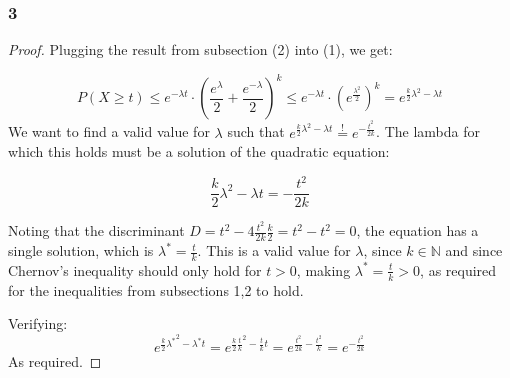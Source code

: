 \subsubsection{3}
\begin{proof}
    Plugging the result from subsection (2) into (1), we get:
    
    \begin{equation*}
        P(X\geq t) \leq e^{-\lambda t}\cdot \left( \frac{e^\lambda}{2} + \frac{e^{-\lambda}}{2} \right)^k
        \leq e^{-\lambda t}\cdot \left( e^{\frac{\lambda^2}{2}} \right)^k = e^{\frac{k}{2}\lambda^2 - \lambda t}
    \end{equation*}
    We want to find a valid value for $\lambda$ such that $e^{\frac{k}{2}\lambda^2 - \lambda t} \overset{!}{=} e^{-\frac{t^2}{2k}}$.
    The lambda for which this holds must be a solution of the quadratic equation:
    
    \begin{equation*}
        \frac{k}{2}\lambda^2 - \lambda t = -\frac{t^2}{2k}
    \end{equation*}
    
    Noting that the discriminant $D = t^2 - 4 \frac{t^2}{2k} \frac{k}{2} = t^2 - t^2 = 0$, the equation has a single solution, which is $\lambda^* = \frac{t}{k}$.
    This is a valid value for $\lambda$, since $k\in \mathbb{N}$ and since Chernov's inequality should only hold for $t > 0$, making $\lambda^* = \frac{t}{k} > 0$, 
    as required for the inequalities from subsections 1,2 to hold.
    
    Verifying:
    \begin{equation*}
        e^{\frac{k}{2}{\lambda^*}^2 - \lambda^* t} = e^{\frac{k}{2}{\frac{t}{k}}^2 - \frac{t}{k} t} = e^{\frac{t^2}{2k} - \frac{t^2}{k}} = e^{-\frac{t^2}{2k}}
    \end{equation*}
    As required.    
\end{proof}